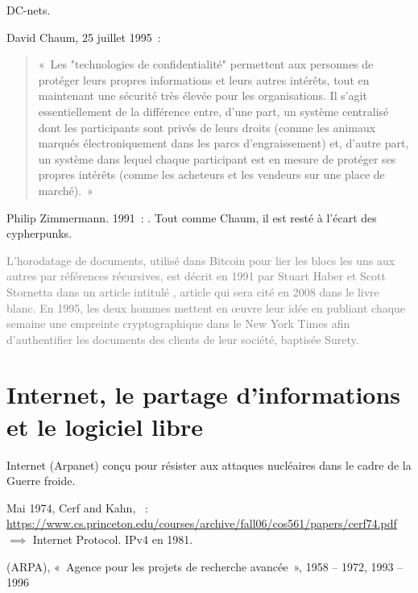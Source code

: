 DC-nets.

David Chaum, 25 juillet 1995~:

\begin{quote}
«~Les "technologies de confidentialité" permettent aux personnes de protéger leurs propres informations et leurs autres intérêts, tout en maintenant une sécurité très élevée pour les organisations. Il s'agit essentiellement de la différence entre, d'une part, un système centralisé dont les participants sont privés de leurs droits (comme les animaux marqués électroniquement dans les parcs d'engraissement) et, d'autre part, un système dans lequel chaque participant est en mesure de protéger ses propres intérêts (comme les acheteurs et les vendeurs sur une place de marché).~»
\end{quote}

Philip Zimmermann. 1991~: . Tout comme Chaum, il est resté à l'écart des cypherpunks.

\textcolor{gray}{L'horodatage de documents, utilisé dans Bitcoin pour lier les blocs les uns aux autres par références récursives, est décrit en 1991 par Stuart Haber et Scott Stornetta dans un article intitulé , article qui sera cité en 2008 dans le livre blanc. En 1995, les deux hommes mettent en œuvre leur idée en publiant chaque semaine une empreinte cryptographique dans le New York Times afin d'authentifier les documents des clients de leur société, baptisée Surety.}

\section{Internet, le partage d'informations et le logiciel libre}


Internet (Arpanet) conçu pour résister aux attaques nucléaires dans le cadre de la Guerre froide.

Mai 1974, Cerf and Kahn, ~: \url{https://www.cs.princeton.edu/courses/archive/fall06/cos561/papers/cerf74.pdf} $\implies$ Internet Protocol. IPv4 en 1981.

 (ARPA), «~Agence pour les projets de recherche avancée~», 1958 -- 1972, 1993 -- 1996

